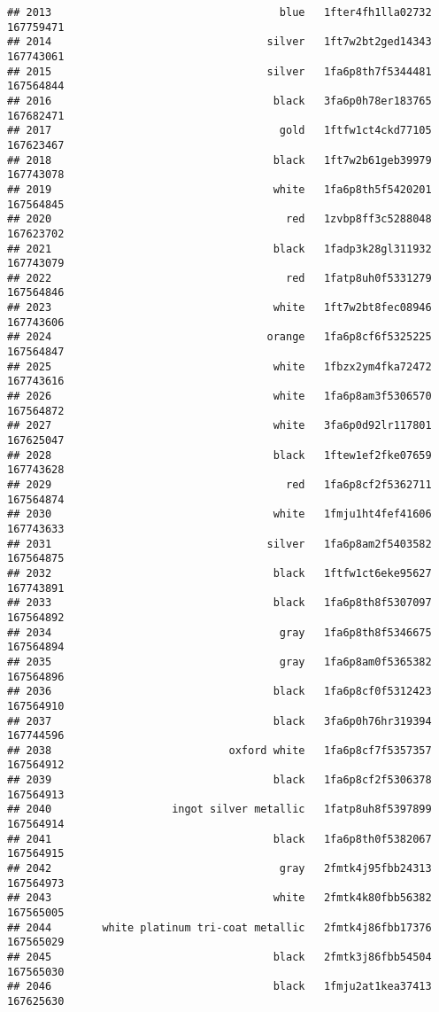\documentclass[
]{article}
\begin{document}
\begin{verbatim}
## 2013                                    blue   1fter4fh1lla02732 167759471
## 2014                                  silver   1ft7w2bt2ged14343 167743061
## 2015                                  silver   1fa6p8th7f5344481 167564844
## 2016                                   black   3fa6p0h78er183765 167682471
## 2017                                    gold   1ftfw1ct4ckd77105 167623467
## 2018                                   black   1ft7w2b61geb39979 167743078
## 2019                                   white   1fa6p8th5f5420201 167564845
## 2020                                     red   1zvbp8ff3c5288048 167623702
## 2021                                   black   1fadp3k28gl311932 167743079
## 2022                                     red   1fatp8uh0f5331279 167564846
## 2023                                   white   1ft7w2bt8fec08946 167743606
## 2024                                  orange   1fa6p8cf6f5325225 167564847
## 2025                                   white   1fbzx2ym4fka72472 167743616
## 2026                                   white   1fa6p8am3f5306570 167564872
## 2027                                   white   3fa6p0d92lr117801 167625047
## 2028                                   black   1ftew1ef2fke07659 167743628
## 2029                                     red   1fa6p8cf2f5362711 167564874
## 2030                                   white   1fmju1ht4fef41606 167743633
## 2031                                  silver   1fa6p8am2f5403582 167564875
## 2032                                   black   1ftfw1ct6eke95627 167743891
## 2033                                   black   1fa6p8th8f5307097 167564892
## 2034                                    gray   1fa6p8th8f5346675 167564894
## 2035                                    gray   1fa6p8am0f5365382 167564896
## 2036                                   black   1fa6p8cf0f5312423 167564910
## 2037                                   black   3fa6p0h76hr319394 167744596
## 2038                            oxford white   1fa6p8cf7f5357357 167564912
## 2039                                   black   1fa6p8cf2f5306378 167564913
## 2040                   ingot silver metallic   1fatp8uh8f5397899 167564914
## 2041                                   black   1fa6p8th0f5382067 167564915
## 2042                                    gray   2fmtk4j95fbb24313 167564973
## 2043                                   white   2fmtk4k80fbb56382 167565005
## 2044        white platinum tri-coat metallic   2fmtk4j86fbb17376 167565029
## 2045                                   black   2fmtk3j86fbb54504 167565030
## 2046                                   black   1fmju2at1kea37413 167625630

\end{verbatim}
\end{document}
